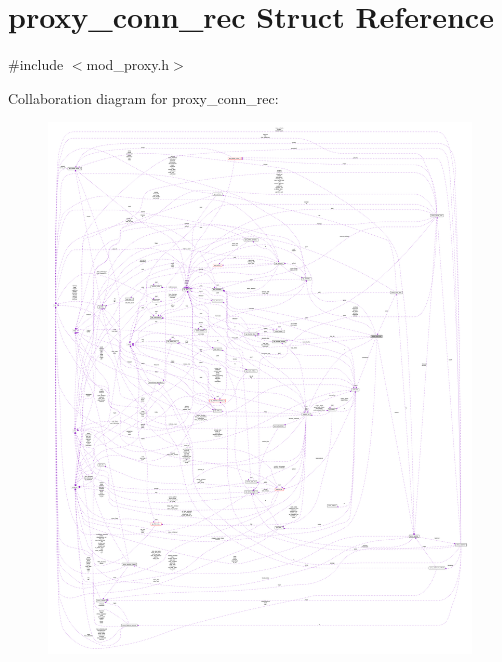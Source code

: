 \hypertarget{structproxy__conn__rec}{}\section{proxy\+\_\+conn\+\_\+rec Struct Reference}
\label{structproxy__conn__rec}


{\ttfamily \#include $<$mod\+\_\+proxy.\+h$>$}



Collaboration diagram for proxy\+\_\+conn\+\_\+rec\+:
\nopagebreak
\begin{figure}[H]
\begin{center}
\leavevmode
\includegraphics[width=350pt]{structproxy__conn__rec__coll__graph}
\end{center}
\end{figure}
